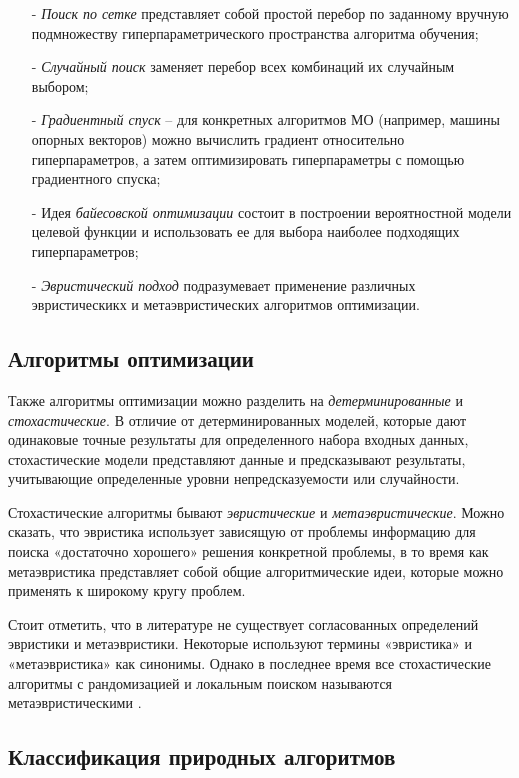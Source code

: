 \begin{itemize}
    \item[-] \emph{Поиск по сетке} представляет собой простой перебор 
    по заданному вручную подмножеству гиперпараметрического пространства 
    алгоритма обучения;
    \item[-] \emph{Случайный поиск} заменяет перебор всех комбинаций их случайным выбором; 
    \item[-] \emph{Градиентный спуск} -- для конкретных алгоритмов МО (например, машины опорных векторов) 
    можно вычислить градиент относительно гиперпараметров, а затем 
    оптимизировать гиперпараметры с помощью градиентного спуска;
    \item[-] Идея \emph{байесовской оптимизации} состоит в построении 
    вероятностной модели целевой функции и использовать ее для выбора 
    наиболее подходящих гиперпараметров;
    \item[-] \emph{Эвристический подход} подразумевает применение различных эвристическикх и 
    метаэвристических алгоритмов оптимизации.
\end{itemize}

\subsection{Алгоритмы оптимизации}

Также алгоритмы оптимизации можно разделить на \emph{детерминированные} и 
\emph{стохастические}. В отличие от детерминированных моделей, 
которые дают одинаковые точные результаты для определенного набора 
входных данных, стохастические модели представляют данные и 
предсказывают результаты, учитывающие определенные уровни 
непредсказуемости или случайности.

Стохастические алгоритмы бывают \emph{эвристические} и \emph{метаэвристические}. 
Можно сказать, что эвристика использует зависящую от проблемы информацию 
для поиска «достаточно хорошего» решения конкретной проблемы, в 
то время как метаэвристика представляет собой общие алгоритмические 
идеи, которые можно применять к широкому кругу проблем.

Стоит отметить, что в литературе не существует согласованных определений 
эвристики и метаэвристики. Некоторые используют термины «эвристика» и 
«метаэвристика» как синонимы. Однако в последнее время все стохастические 
алгоритмы с рандомизацией и локальным поиском называются 
метаэвристическими \cite{Yang2009}.

\subsection{Классификация природных алгоритмов}

